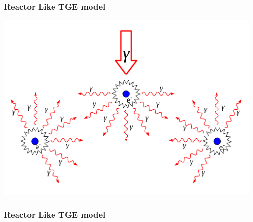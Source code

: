 \documentclass[8pt,pdf,hyperref={unicode}]{beamer}
\begin{document}
%
\begin{frame}
    \frametitle{Reactor Like TGE model}
 \centering\includegraphics[width=0.8\paperwidth]{draw.pdf}

\end{frame}
\usebackgroundtemplate{}
\begin{frame}
\frametitle{Reactor Like TGE model}

\end{frame}
\end{document}
